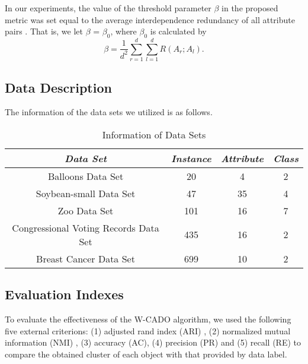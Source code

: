 \documentclass[review]{elsarticle}
\begin{document}
In our experiments, the value of the threshold parameter $\beta$ in the proposed metric was set equal to the average interdependence redundancy of all attribute pairs \cite{JiaH2016NewMetric}. That is, we let $\beta$ = $\beta_0$, where $\beta_0$ is calculated by
\begin{equation}
\beta = \frac{1}{d^2}\sum_{r=1}^{d}\sum_{l=1}^{d}R(A_r;A_l).
\label{equ21}
\end{equation}

\subsection{Data Description}
The information of the data sets we utilized is as follows.
\begin{table}[!h]\tabcolsep=0.065in
\centering
\caption{Information of Data Sets}
\small
\label{tab:Information of data sets}
\begin{tabular}{c|c|c|c}
\hline
\emph{Data Set}&\emph{Instance}&\emph{Attribute}&\emph{Class} \\
\hline
Balloons Data Set                       & 20  & 4   & 2 \\
Soybean-small Data Set                  & 47  & 35  & 4 \\
Zoo Data Set                            & 101 & 16  & 7 \\
Congressional Voting Records Data Set   & 435 & 16  & 2 \\
Breast Cancer Data Set                  & 699 & 10  & 2 \\
\hline
\end{tabular}
\end{table}

\subsection{Evaluation Indexes}
To evaluate the effectiveness of the W-CADO algorithm, we used the following five external criterions: (1) adjusted rand index (ARI) \cite{LiangJY2012means}, (2) normalized mutual information (NMI) \cite{strehl2003cluster}, (3) accuracy (AC), (4) precision (PR) and (5) recall (RE) to compare the obtained cluster of each object with that provided by data label.
\end{document}
